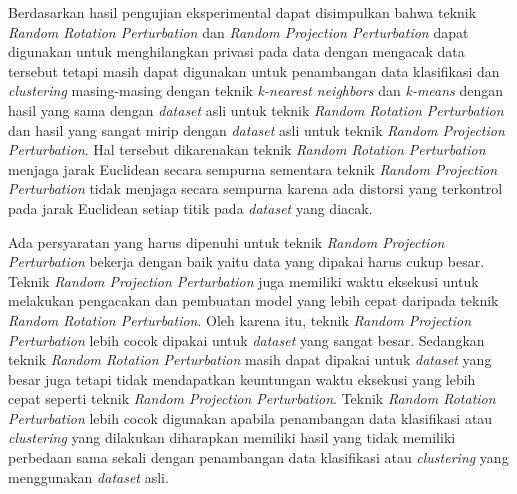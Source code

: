 Berdasarkan hasil pengujian eksperimental dapat disimpulkan bahwa teknik \textit{Random Rotation Perturbation} dan \textit{Random Projection Perturbation} dapat digunakan untuk menghilangkan privasi pada data dengan mengacak data tersebut tetapi masih dapat digunakan untuk penambangan data klasifikasi dan \textit{clustering} masing-masing dengan teknik \textit{k-nearest neighbors} dan \textit{k-means} dengan hasil yang sama dengan \textit{dataset} asli untuk teknik \textit{Random Rotation Perturbation} dan hasil yang sangat mirip dengan \textit{dataset} asli untuk teknik \textit{Random Projection Perturbation}. Hal tersebut dikarenakan teknik \textit{Random Rotation Perturbation} menjaga jarak Euclidean secara sempurna sementara teknik \textit{Random Projection Perturbation} tidak menjaga secara sempurna karena ada distorsi yang terkontrol pada jarak Euclidean setiap titik pada \textit{dataset} yang diacak. 

Ada persyaratan yang harus dipenuhi untuk teknik \textit{Random Projection Perturbation} bekerja dengan baik yaitu data yang dipakai harus cukup besar. Teknik \textit{Random Projection Perturbation} juga memiliki waktu eksekusi untuk melakukan pengacakan dan pembuatan model yang lebih cepat daripada teknik \textit{Random Rotation Perturbation}. Oleh karena itu, teknik \textit{Random Projection Perturbation} lebih cocok dipakai untuk \textit{dataset} yang sangat besar. Sedangkan teknik \textit{Random Rotation Perturbation} masih dapat dipakai untuk \textit{dataset} yang besar juga tetapi tidak mendapatkan keuntungan waktu eksekusi yang lebih cepat seperti teknik \textit{Random Projection Perturbation}. Teknik \textit{Random Rotation Perturbation} lebih cocok digunakan apabila penambangan data klasifikasi atau \textit{clustering} yang dilakukan diharapkan memiliki hasil yang tidak memiliki perbedaan sama sekali dengan penambangan data klasifikasi atau \textit{clustering} yang menggunakan \textit{dataset} asli. 